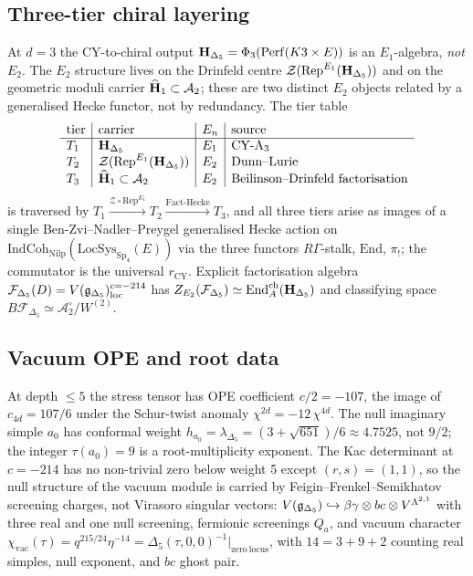 \subsection{Three-tier chiral layering}

At $d = 3$ the CY-to-chiral output $\mathbf{H}_{\Delta_5} = \Phi_3(\mathrm{Perf}(K3\times E))$
is an $E_1$-algebra, \emph{not} $E_2$. The $E_2$ structure lives on the
Drinfeld centre $\mathcal{Z}(\mathrm{Rep}^{E_1}(\mathbf{H}_{\Delta_5}))$ and on the geometric
moduli carrier $\widehat{\mathbf{H}}_1 \subset \mathcal{A}_2$; these are two distinct $E_2$
objects related by a generalised Hecke functor, not by redundancy.
The tier table
\[
\begin{array}{l|l|l|l}
\text{tier} & \text{carrier} & E_n & \text{source} \\ \hline
T_1 & \mathbf{H}_{\Delta_5} & E_1 & \text{CY-A}_3 \\
T_2 & \mathcal{Z}(\mathrm{Rep}^{E_1}(\mathbf{H}_{\Delta_5})) & E_2 & \text{Dunn--Lurie} \\
T_3 & \widehat{\mathbf{H}}_1 \subset \mathcal{A}_2 & E_2 & \text{Beilinson--Drinfeld factorisation}
\end{array}
\]
is traversed by $T_1 \xrightarrow{\mathcal{Z} \circ \mathrm{Rep}^{E_1}} T_2 \xrightarrow{\mathrm{Fact\text{-}Hecke}} T_3$,
and all three tiers arise as images of a single Ben-Zvi--Nadler--Preygel
generalised Hecke action on $\mathrm{IndCoh}_{\mathrm{Nilp}}(\mathrm{LocSys}_{\mathrm{Sp}_4}(E))$
via the three functors $R\Gamma$-stalk, $\mathrm{End}$, $\pi_!$; the commutator
is the universal $r_{\mathrm{CY}}$. Explicit factorisation algebra
$\mathcal{F}_{\Delta_5}(D) = V(\mathfrak{g}_{\Delta_5})_{\mathrm{loc}}^{c = -214}$ has
$Z_{E_2}(\mathcal{F}_{\Delta_5}) \simeq \mathrm{End}^{\mathrm{ch}}_A(\mathbf{H}_{\Delta_5})$
and classifying space $B\mathcal{F}_{\Delta_5} \simeq \mathcal{A}_2^\circ / W^{(2)}$.

\subsection{Vacuum OPE and root data}

At depth $\leq 5$ the stress tensor has OPE coefficient $c/2 = -107$,
the image of $c_{4d} = 107/6$ under the Schur-twist anomaly $\chi^{2d} = -12\,\chi^{4d}$.
The null imaginary simple $a_0$ has conformal weight
$h_{a_0} = \lambda_{\Delta_5} = (3 + \sqrt{651})/6 \approx 4.7525$,
not $9/2$; the integer $\tau(a_0) = 9$ is a root-multiplicity exponent.
The Kac determinant at $c = -214$ has no non-trivial zero below weight 5 except $(r,s) = (1,1)$, so the null structure of the vacuum module is carried by
Feigin--Frenkel--Semikhatov screening charges, not Virasoro singular vectors:
$V(\mathfrak{g}_{\Delta_5}) \hookrightarrow \beta\gamma \otimes bc \otimes V^{\Lambda^{2,1}}$
with three real and one null screening, fermionic screenings $Q_a$, and
vacuum character
$\chi_{\mathrm{vac}}(\tau) = q^{215/24}\eta^{-14}
= \Delta_5(\tau, 0, 0)^{-1}|_{\mathrm{zero\ locus}}$,
with $14 = 3 + 9 + 2$ counting real simples, null exponent, and $bc$ ghost pair.

